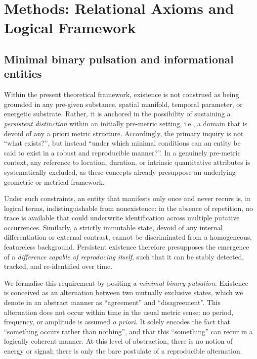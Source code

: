 \documentclass[11pt,a4paper]{article}
\begin{document}
\section{Methods: Relational Axioms and Logical Framework}
\subsection{Minimal binary pulsation and informational entities}

Within the present theoretical framework, existence is not construed as being grounded in any pre-given substance, spatial manifold, temporal parameter, or energetic substrate. Rather, it is anchored in the possibility of sustaining a \emph{persistent distinction} within an initially pre-metric setting, i.e., a domain that is devoid of any a priori metric structure. Accordingly, the primary inquiry is not ``what exists?'', but instead ``under which minimal conditions can an entity be said to exist in a robust and reproducible manner?''. In a genuinely pre-metric context, any reference to location, duration, or intrinsic quantitative attributes is systematically excluded, as these concepts already presuppose an underlying geometric or metrical framework.

Under such constraints, an entity that manifests only once and never recurs is, in logical terms, indistinguishable from nonexistence: in the absence of repetition, no trace is available that could underwrite identification across multiple putative occurrences. Similarly, a strictly immutable state, devoid of any internal differentiation or external contrast, cannot be discriminated from a homogeneous, featureless background. Persistent existence therefore presupposes the emergence of a \emph{difference capable of reproducing itself}, such that it can be stably detected, tracked, and re-identified over time.

We formalise this requirement by positing a \emph{minimal binary pulsation}. Existence is conceived as an alternation between two mutually exclusive states, which we denote in an abstract manner as “agreement” and “disagreement”. This alternation does not occur within time in the usual metric sense: no period, frequency, or amplitude is assumed \emph{a priori}. It solely encodes the fact that “something occurs rather than nothing”, and that this “something” can recur in a logically coherent manner. At this level of abstraction, there is no notion of energy or signal; there is only the bare postulate of a reproducible alternation.
\end{document}
